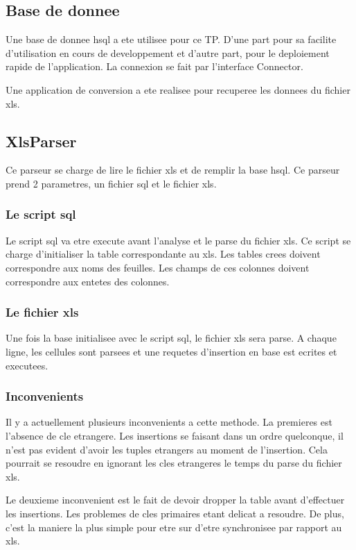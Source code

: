 \subsection{Base de donnee}
Une base de donnee hsql a ete utilisee pour ce TP. D'une part pour sa facilite d'utilisation en cours de developpement et d'autre part, pour le deploiement rapide de l'application. La connexion se fait par l'interface Connector.

Une application de conversion a ete realisee pour recuperee les donnees du fichier xls.
\subsection{XlsParser}
Ce parseur se charge de lire le fichier xls et de remplir la base hsql. Ce parseur prend 2 parametres, un fichier sql et le fichier xls.
\subsubsection{Le script sql}
Le script sql va etre execute avant l'analyse et le parse du fichier xls. Ce script se charge d'initialiser la table correspondante au xls. Les tables crees doivent correspondre aux noms des feuilles. Les champs de ces colonnes doivent correspondre aux entetes des colonnes.
\subsubsection{Le fichier xls}
Une fois la base initialisee avec le script sql, le fichier xls sera parse. A chaque ligne, les cellules sont parsees et une requetes d'insertion en base est ecrites et executees.
\subsubsection{Inconvenients}
Il y a actuellement plusieurs inconvenients a cette methode. La premieres est l'absence de cle etrangere. Les insertions se faisant dans un ordre quelconque, il n'est pas evident d'avoir les tuples etrangers au moment de l'insertion. Cela pourrait se resoudre en ignorant les cles etrangeres le temps du parse du fichier xls.

Le deuxieme inconvenient est le fait de devoir dropper la table avant d'effectuer les insertions. Les problemes de cles primaires etant delicat a resoudre. De plus, c'est la maniere la plus simple pour etre sur d'etre synchronisee par rapport au xls.
